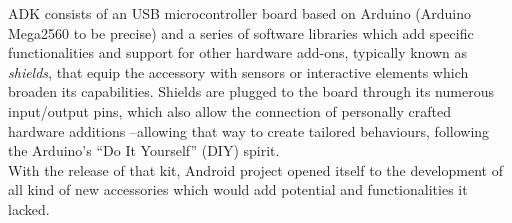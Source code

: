 \begin{itemize}
				ADK consists of an USB microcontroller board based on Arduino (Arduino Mega2560 to be precise) and a
				series of software libraries which add specific functionalities and support for other hardware add-ons,
				typically known as \emph{shields}, that equip the accessory with sensors or interactive elements
				which broaden its capabilities. Shields are plugged to the board through its numerous input/output
				pins, which also allow the connection of personally crafted hardware additions --allowing that way to
				create tailored behaviours, following the Arduino's ``Do It Yourself'' (DIY) spirit.\\

				With the release of that kit, Android project opened itself to the development
				of all kind of new accessories which would add potential and functionalities
				it lacked.\\


\end{itemize}
